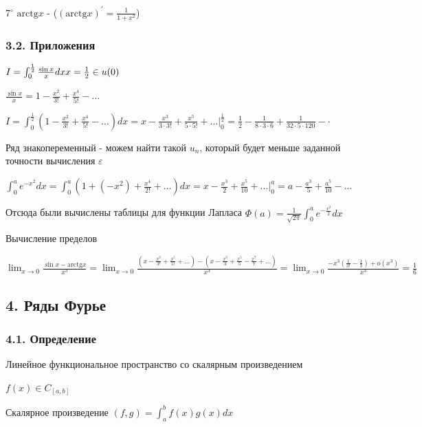 \documentclass[12pt]{article}
\begin{document}
    \mediumvspace

    7$^\circ$ $\mathrm{arctg} x$ - \Lab ($(\mathrm{arctg} x)^\prime = \frac{1}{1 + x^2}$)

    \subsubsection{3.2. Приложения}

     $I = \int_0^{\frac{1}{2}} \frac{\sin x}{x} dx \hfill x = \frac{1}{2} \in u(0)$

    $\frac{\sin x}{x} = 1 - \frac{x^2}{3!} + \frac{x^4}{5!} - \dots$

    $I = \int_0^{\frac{1}{2}} (1 - \frac{x^2}{3!} + \frac{x^4}{5!} - \dots) dx = x - \frac{x^3}{3 \cdot 3!} + \frac{x^5}{5 \cdot 5!} + \dots \Big|_{0}^{\frac{1}{2}} = 
    \frac{1}{2} - \frac{1}{8 \cdot 3 \cdot 6} + \frac{1}{32 \cdot 5 \cdot 120} - \cdot$

    Ряд знакопеременный - можем найти такой $u_n$, который будет меньше заданной точности вычисления $\varepsilon$

     $\int_0^{a} e^{-x^2} dx = \int_0^a (1 + (-x^2) + \frac{x^4}{2!} + \dots) dx = x - \frac{x^3}{2} + \frac{x^5}{10} + \dots \Big|_0^a = a - \frac{a^3}{5} + \frac{a^5}{10} - \dots$

    Отсюда были вычислены таблицы для функции Лапласа $\Phi(a) = \frac{1}{\sqrt{2\pi}} \int_0^a e^{-\frac{x^2}{2}} dx$

     Вычисление пределов

    $\lim_{x \to 0} \frac{\sin x - \mathrm{arctg} x}{x^3} = \lim_{x \to 0} \frac{(x - \frac{x^3}{3!} + \frac{x^5}{5!} + \dots) - (x - \frac{x^3}{3} + \frac{x^5}{5} - \frac{x^7}{7} + \dots)}{x^3} = 
    \lim_{x \to 0} \frac{-x^3 (\frac{1}{3!} - \frac{1}{3}) + o(x^3)}{x^3} = \frac{1}{6}$

    \subsection{4. Ряды Фурье}

    \subsubsection{4.1. Определение}

    \Mem Линейное функциональное пространство со скалярным произведением

    $f(x) \in C_{[a,b]}$

    Скалярное произведение $(f, g) = \int_a^b f(x)g(x) dx$
\end{document}
